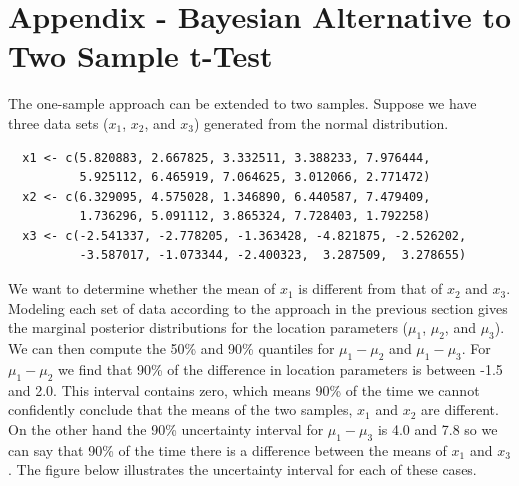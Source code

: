 \documentclass[12pt]{article}
\begin{document}
\pagebreak

\section{Appendix - Bayesian Alternative to Two Sample t-Test}

The one-sample approach can be extended to two samples. Suppose we have three data sets ($x_1$, $x_2$, and $x_3$) generated from the normal distribution.

\begin{verbatim}
  x1 <- c(5.820883, 2.667825, 3.332511, 3.388233, 7.976444,
          5.925112, 6.465919, 7.064625, 3.012066, 2.771472)
  x2 <- c(6.329095, 4.575028, 1.346890, 6.440587, 7.479409,
          1.736296, 5.091112, 3.865324, 7.728403, 1.792258)
  x3 <- c(-2.541337, -2.778205, -1.363428, -4.821875, -2.526202,
          -3.587017, -1.073344, -2.400323,  3.287509,  3.278655)
\end{verbatim}

\noindent We want to determine whether the mean of $x_1$ is different from that of $x_2$ and $x_3$. Modeling each set of data according to the approach in the previous section gives the marginal posterior distributions for the location parameters ($\mu_1$, $\mu_2$, and $\mu_3$). We can then compute the 50\% and 90\% quantiles for $\mu_1 - \mu_2$ and $\mu_1 - \mu_3$. For $\mu_1 - \mu_2$ we find that 90\% of the difference in location parameters is between -1.5 and 2.0. This interval contains zero, which means 90\% of the time we cannot confidently conclude that the means of the two samples, $x_1$ and $x_2$ are different. On the other hand the 90\% uncertainty interval for $\mu_1 - \mu_3$ is 4.0 and 7.8 so we can say that 90\% of the time there is a difference between the means of $x_1$ and $x_3$. The figure below illustrates the uncertainty interval for each of these cases.
\end{document}
